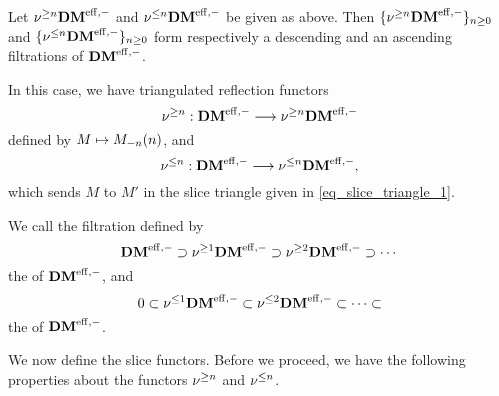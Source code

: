 \begin{prop}\label{prop_slice_DMeff}
Let $\sgDM{n} \DMeff$ and $\slDM{n} \DMeff$ be given as above.
Then $\{\sgDM{n} \DMeff\}_{n \geq 0}$ and $\{\slDM{n} \DMeff\}_{n 
\geq 0}$ form respectively a descending and an ascending 
filtrations of $\DMeff$.

In this case, we have triangulated reflection functors 
\[
\sgDM{n}: \DMeff \to \sgDM{n}\DMeff
\] 
defined by $M \mapsto \tZ[n]{\hZ[n]{M}}$, and 
\[
\slDM{n}: \DMeff \to \slDM{n}\DMeff,
\]
which sends $M$ to $M'$ in the slice triangle given in 
\eqref{eq_slice_triangle_1}.
\end{prop}

\begin{defn}
We call the filtration defined by
\[
\DMeff \supset \sgDM{1}\DMeff \supset \sgDM{2}\DMeff \supset \cdots \\
\]
the  of $\DMeff$, and
\[
0 \subset \slDM{1}\DMeff \subset \slDM{2}\DMeff \subset \cdots \subset
\]
the  of $\DMeff$.
\end{defn}

We now define the slice functors. Before we proceed, we have the
following properties about the functors $\sgDM{n}$ and $\slDM{n}$.

